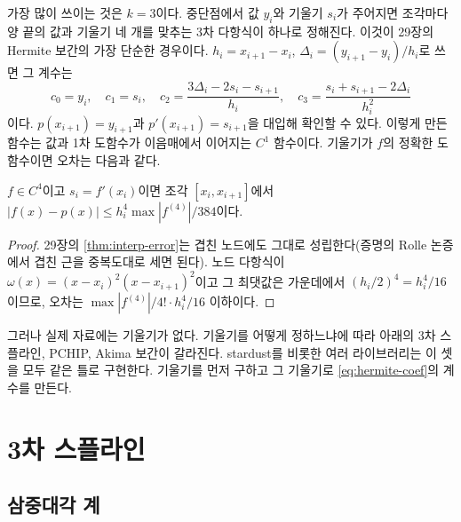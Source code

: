 가장 많이 쓰이는 것은 $k=3$이다. 중단점에서 값 $y_i$와 기울기 $s_i$가 주어지면 조각마다 양 끝의 값과 기울기 네 개를 맞추는 3차 다항식이 하나로 정해진다. 이것이 29장의 Hermite 보간의 가장 단순한 경우이다. $h_i=x_{i+1}-x_i$, $\Delta_i=(y_{i+1}-y_i)/h_i$로 쓰면 그 계수는
\begin{equation}
\label{eq:hermite-coef}
c_0=y_i,\quad c_1=s_i,\quad c_2=\frac{3\Delta_i-2s_i-s_{i+1}}{h_i},\quad c_3=\frac{s_i+s_{i+1}-2\Delta_i}{h_i^2}
\end{equation}
이다. $p(x_{i+1})=y_{i+1}$과 $p'(x_{i+1})=s_{i+1}$을 대입해 확인할 수 있다. 이렇게 만든 함수는 값과 1차 도함수가 이음매에서 이어지는 $C^1$ 함수이다. 기울기가 $f$의 정확한 도함수이면 오차는 다음과 같다.

\begin{proposition}
\label{prop:hermite-error}
$f\in C^4$이고 $s_i=f'(x_i)$이면 조각 $[x_i,x_{i+1}]$에서 $|f(x)-p(x)|\le h_i^4\max|f^{(4)}|/384$이다.
\end{proposition}

\begin{proof}
29장의 \cref{thm:interp-error}는 겹친 노드에도 그대로 성립한다(증명의 Rolle 논증에서 겹친 근을 중복도대로 세면 된다). 노드 다항식이 $\omega(x)=(x-x_i)^2(x-x_{i+1})^2$이고 그 최댓값은 가운데에서 $(h_i/2)^4=h_i^4/16$이므로, 오차는 $\max|f^{(4)}|/4!\cdot h_i^4/16$ 이하이다.
\end{proof}

그러나 실제 자료에는 기울기가 없다. 기울기를 어떻게 정하느냐에 따라 아래의 3차 스플라인, PCHIP, Akima 보간이 갈라진다. stardust를 비롯한 여러 라이브러리는 이 셋을 모두 같은 틀로 구현한다. 기울기를 먼저 구하고 그 기울기로 \eqref{eq:hermite-coef}의 계수를 만든다.

\section{3차 스플라인}
\label{sec:cubic-spline}

\subsection{삼중대각 계}

